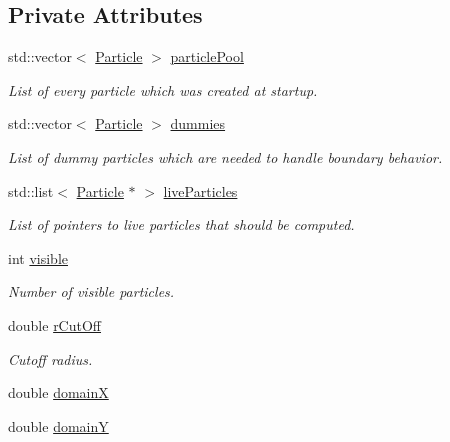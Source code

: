 \subsection*{Private Attributes}
\begin{DoxyCompactItemize}
\item 
std\-::vector$<$ \hyperlink{classSimulation_1_1Particle}{Particle} $>$ \hyperlink{classSimulation_1_1ParticleContainer_a45869e923d4b355d3be609ec78235bf0}{particle\-Pool}
\begin{DoxyCompactList}\small\item\em List of every particle which was created at startup. \end{DoxyCompactList}\item 
std\-::vector$<$ \hyperlink{classSimulation_1_1Particle}{Particle} $>$ \hyperlink{classSimulation_1_1ParticleContainer_af7710cc9a30897b05c4dae5610562f2e}{dummies}
\begin{DoxyCompactList}\small\item\em List of dummy particles which are needed to handle boundary behavior. \end{DoxyCompactList}\item 
std\-::list$<$ \hyperlink{classSimulation_1_1Particle}{Particle} $\ast$ $>$ \hyperlink{classSimulation_1_1ParticleContainer_a851707b9ea1f91a934e7eda5e219b97d}{live\-Particles}
\begin{DoxyCompactList}\small\item\em List of pointers to live particles that should be computed. \end{DoxyCompactList}\item 
int \hyperlink{classSimulation_1_1ParticleContainer_a3e3805eea543d96c5cf6ced07b9c2e7b}{visible}
\begin{DoxyCompactList}\small\item\em Number of visible particles. \end{DoxyCompactList}\item 
double \hyperlink{classSimulation_1_1ParticleContainer_a1f0e9467546c765bf8533a307b5587e1}{r\-Cut\-Off}
\begin{DoxyCompactList}\small\item\em Cutoff radius. \end{DoxyCompactList}\item 
double \hyperlink{classSimulation_1_1ParticleContainer_a62984b65f30802a718edb5a1d7a20974}{domain\-X}
\item 
double \hyperlink{classSimulation_1_1ParticleContainer_a6398508c88afa2b1f50516457d20d747}{domain\-Y}

\end{DoxyCompactItemize}
